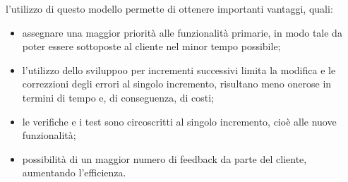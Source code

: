 l'utilizzo di questo modello permette di ottenere importanti vantaggi, quali:
\begin{itemize}
    \item assegnare una maggior priorità alle funzionalità primarie, in modo tale da poter essere sottoposte al cliente nel minor tempo possibile;
    \item l'utilizzo dello sviluppoo per incrementi successivi limita la modifica e le correzzioni degli errori al singolo incremento, risultano meno onerose in termini di tempo e, di conseguenza, di costi;
    \item le verifiche e i test sono circoscritti al singolo incremento, cioè alle nuove funzionalità;
    \item possibilità di un maggior numero di feedback da parte del cliente, aumentando l'efficienza.
\end{itemize}